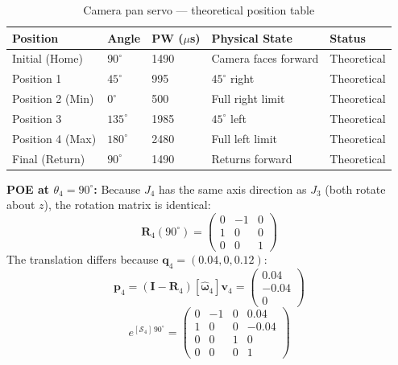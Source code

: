 \documentclass[12pt,a4paper]{article}
\newcommand{\vect}[1]{\bm{#1}}
\newcommand{\mat}[1]{\mathbf{#1}}
\begin{document}
\begin{table}[h!]
\centering
\caption{Camera pan servo --- theoretical position table}
\renewcommand{\arraystretch}{1.3}
\begin{tabularx}{\linewidth}{L{2.5cm} C{1.5cm} C{1.8cm} L{3.5cm} C{2.8cm}}
\toprule
{}
\color{white}\textbf{Position} &
\color{white}\textbf{Angle} &
\color{white}\textbf{PW ($\mu$s)} &
\color{white}\textbf{Physical State} &
\color{white}\textbf{Status} \\
\midrule
Initial (Home) & $90^\circ$ & 1490 & Camera faces forward & \color{DangerRed}Theoretical \\
Position 1 & $45^\circ$ & 995 & $45^\circ$ right & \color{DangerRed}Theoretical \\
Position 2 (Min) & $0^\circ$ & 500 & Full right limit & \color{DangerRed}Theoretical \\
Position 3 & $135^\circ$ & 1985 & $45^\circ$ left & \color{DangerRed}Theoretical \\
Position 4 (Max) & $180^\circ$ & 2480 & Full left limit & \color{DangerRed}Theoretical \\
Final (Return) & $90^\circ$ & 1490 & Returns forward & \color{DangerRed}Theoretical \\
\bottomrule
\end{tabularx}
\end{table}

\textbf{POE at $\theta_4 = 90^\circ$:}
Because $J_4$ has the same axis direction as $J_3$ (both rotate about $z$), the
rotation matrix is identical:
\[
  \mat{R}_4(90^\circ) = \begin{pmatrix}0&-1&0\\1&0&0\\0&0&1\end{pmatrix}
\]
The translation differs because $\vect{q}_4 = (0.04, 0, 0.12)$:
\[
  \vect{p}_4 = (\mat{I}-\mat{R}_4)[\vect{\hat\omega}_4]\vect{v}_4
  = \begin{pmatrix}0.04\\-0.04\\0\end{pmatrix}
\]
\[
  e^{[\mathcal{S}_4]\,90^\circ}
  = \begin{pmatrix}0&-1&0&0.04\\1&0&0&-0.04\\0&0&1&0\\0&0&0&1\end{pmatrix}
\]
\end{document}
